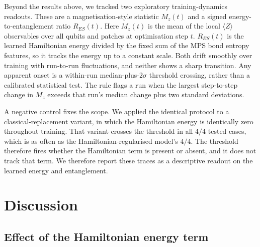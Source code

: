 \documentclass[pdflatex,sn-basic]{sn-jnl}
\begin{document}
Beyond the results above, we tracked two exploratory training-dynamics readouts.
These are a magnetisation-style statistic $M_z(t)$ and a signed energy-to-entanglement ratio $R_{ES}(t)$.
Here $M_z(t)$ is the mean of the local $\langle Z\rangle$ observables over all qubits and patches at optimisation step $t$.
$R_{ES}(t)$ is the learned Hamiltonian energy divided by the fixed sum of the MPS bond entropy features, so it tracks the energy up to a constant scale.
Both drift smoothly over training with run-to-run fluctuations, and neither shows a sharp transition.
Any apparent onset is a within-run median-plus-$2\sigma$ threshold crossing, rather than a calibrated statistical test.
The rule flags a run when the largest step-to-step change in $M_z$ exceeds that run's median change plus two standard deviations.

A negative control fixes the scope.
We applied the identical protocol to a classical-replacement variant, in which the Hamiltonian energy is identically zero throughout training.
That variant crosses the threshold in all $4/4$ tested cases, which is as often as the Hamiltonian-regularised model's $4/4$.
The threshold therefore fires whether the Hamiltonian term is present or absent, and it does not track that term.
We therefore report these traces as a descriptive readout on the learned energy and entanglement.

\section{Discussion}
\label{sec:discussion}

\subsection{Effect of the Hamiltonian energy term}
\label{sec:regularizer_inert}
\end{document}
